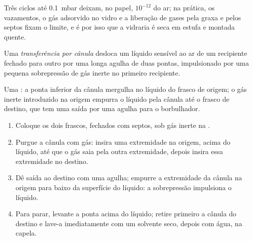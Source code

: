 Três ciclos até \qty{0.1}{mbar} deixam, no papel, $10^{-12}$ do ar; na prática, os vazamentos, o gás
adsorvido no vidro e a liberação de gases pela graxa e pelos septos fixam o limite, e é
por isso que a vidraria é seca em estufa e montada quente.

\begin{definition}\label{def:b3:lab-techniques-3:cannula}
Uma \emph{transferência por cânula} desloca um líquido sensível ao ar
de um recipiente fechado para outro por uma longa agulha de duas pontas, impulsionado
por uma pequena sobrepressão de gás inerte no primeiro recipiente.
\end{definition}

\begin{omfigure}

{\small Uma : a ponta inferior da cânula mergulha no líquido do
frasco de origem; o gás inerte introduzido na origem empurra o líquido pela
cânula até o frasco de destino, que tem uma saída por uma agulha para o borbulhador.}
\end{omfigure}

\begin{method}\label{met:b3:lab-techniques-3:cannula}
\begin{enumerate}
  \item Coloque os dois frascos, fechados com septos, sob gás inerte na .
  \item Purgue a cânula com gás: insira uma extremidade na origem, acima do líquido,
        até que o gás saia pela outra extremidade, depois insira essa extremidade no destino.
  \item Dê saída ao destino com uma agulha; empurre a extremidade da cânula na origem para baixo da
        superfície do líquido: a sobrepressão impulsiona o líquido.
  \item Para parar, levante a ponta acima do líquido; retire primeiro a cânula do destino
        e lave-a imediatamente com um solvente seco, depois com água, na capela.
\end{enumerate}
\end{method}

